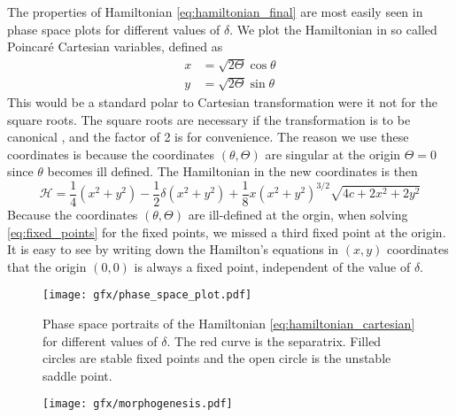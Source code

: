 The properties of Hamiltonian \ref{eq:hamiltonian_final} are most easily seen
in phase space plots for different values of $\delta$. We plot the Hamiltonian
in so called Poincaré Cartesian variables, defined as 
\begin{equation}
    \begin{aligned}
        x&=\sqrt{2\Theta}\cos\theta\\
        y&=\sqrt{2\Theta}\sin\theta
    \end{aligned}
\end{equation}
This would be a standard polar to Cartesian transformation were it not for the 
square roots. The square roots are necessary if the transformation is to be 
canonical \citep{sylvio}, and the factor of 2 is for convenience. The reason
we use these coordinates is because the coordinates $(\theta,\Theta)$ are
singular at the origin $\Theta=0$ since $\theta$ becomes ill defined. 
The Hamiltonian in the new coordinates is then
\begin{equation}
    \mathcal{H}= \frac{1}{4}\left( x^2+y^2\right) - \frac{1}{2}\delta\left(
    x^2+y^2\right)+ \frac{1}{8} x\left(x^2+y^2\right)^{3/2}\sqrt{4c+2x^2+2y^2}
    \label{eq:hamiltonian_cartesian}
\end{equation}
Because the coordinates $(\theta,\Theta)$ are ill-defined at the orgin, when
solving \cref{eq:fixed_points} for the fixed points, we missed a third fixed 
point at the origin. It is easy to see by writing down the Hamilton's
equations in $(x,y)$ coordinates that the origin $(0,0)$ is always a fixed
point, independent of the value of $\delta$.



\begin{figure}[htb]
\centering
\texttt{[image: gfx/phase\_space\_plot.pdf]}
    \caption{Phase space portraits of the Hamiltonian 
    \ref{eq:hamiltonian_cartesian} for different values of 
    $\delta$. The red curve
    is the separatrix. Filled circles are stable fixed points and the open
    circle is the unstable saddle point.}
\label{fig:phase_space}
\end{figure}
\begin{figure}[htb]
\centering
\texttt{[image: gfx/morphogenesis.pdf]}
\caption{}
\label{fig:morphogenesis}
\end{figure}

